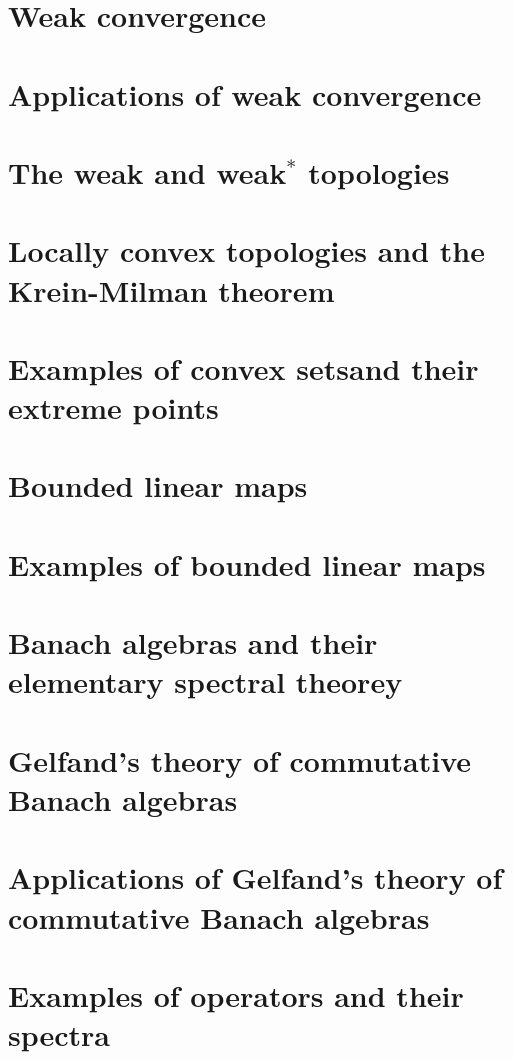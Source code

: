 \documentclass[11pt]{elegantbook}
\begin{document}
\chapter{Weak convergence}

\chapter{Applications of weak convergence}

\chapter{The weak and weak$^\ast$ topologies}

\chapter{Locally convex topologies and the Krein-Milman theorem}

\chapter{Examples of convex setsand their extreme points}

\chapter{Bounded linear maps}

\chapter{Examples of bounded linear maps}

\chapter{Banach algebras and their elementary spectral theorey}

\chapter{Gelfand's theory of commutative Banach algebras}

\chapter{Applications of Gelfand's theory of commutative Banach algebras}

\chapter{Examples of operators and their spectra}
\end{document}
